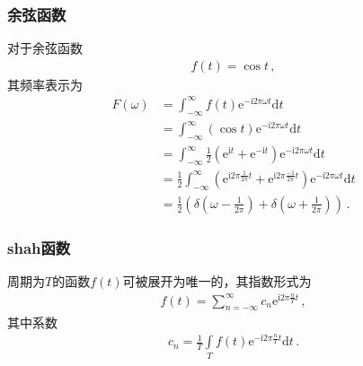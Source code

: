 \subsubsection*{余弦函数}
对于余弦函数
\begin{align}
    f(t)=\cos t\, ,
\end{align}
其频率表示为
\begin{align}
    F(\omega) & =\int_{-\infty}^{\infty}f(t)\mathrm{e}^{-\mathrm{i}2\pi\omega t}\mathrm{d}t\nonumber                                                                                                \\
              & =\int_{-\infty}^{\infty}(\cos t)\mathrm{e}^{-\mathrm{i}2\pi\omega t}\mathrm{d}t\nonumber                                                                                            \\
              & =\int_{-\infty}^{\infty}\frac{1}{2}(\mathrm{e}^{\mathrm{i}t}+\mathrm{e}^{-\mathrm{i}t})\mathrm{e}^{-\mathrm{i}2\pi\omega t}\mathrm{d}t\nonumber                                     \\
              & =\frac{1}{2}\int_{-\infty}^{\infty}(\mathrm{e}^{\mathrm{i}2\pi\frac{1}{2\pi}t}+\mathrm{e}^{\mathrm{i}2\pi\frac{-1}{2\pi}t})\mathrm{e}^{-\mathrm{i}2\pi\omega t}\mathrm{d}t\nonumber \\
              & =\frac{1}{2}\left(\delta\left(\omega-\frac{1}{2\pi}\right)+\delta\left(\omega+\frac{1}{2\pi}\right)\right)\, .
\end{align}

\subsubsection*{shah函数}
\begin{theorem}
    周期为$T$的函数$f(t)$可被展开为唯一的，其指数形式为
    \begin{align}
        f(t)=\sum\limits_{n=-\infty}^{\infty}c_n\mathrm{e}^{\mathrm{i}2\pi\frac{n}{T}t}\, ,
    \end{align}
    其中系数
    \begin{align}
        c_n=\frac{1}{T}\int\limits_T f(t)\mathrm{e}^{-\mathrm{i}2\pi\frac{n}{T}t}\mathrm{d}t\, .
    \end{align}
\end{theorem}

